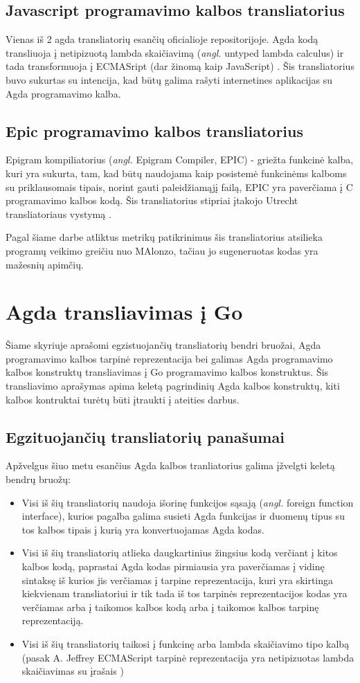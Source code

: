 \documentclass{VUMIFPSkursinis}
\begin{document}
\subsection{Javascript programavimo kalbos transliatorius}
Vienas iš 2 agda transliatorių esančių oficialioje repositorijoje. Agda kodą transliuoja į netipizuotą lambda skaičiavimą (\textit{angl.} untyped lambda calculus) ir tada transformuoja į ECMASript (dar žinomą kaip JavaScript) \cite{html_agda}. Šis transliatorius buvo sukurtas su intencija, kad būtų galima rašyti internetines aplikacijas su Agda programavimo kalba.
\subsection{Epic programavimo kalbos transliatorius}
Epigram kompiliatorius (\textit{angl.} Epigram Compiler, EPIC) - griežta funkcinė kalba, kuri yra sukurta, tam, kad būtų naudojama kaip posistemė funkcinėms kalboms su priklausomais tipais, norint gauti paleidžiamąjį failą, EPIC yra paverčiama į C programavimo kalbos kodą. Šis transliatorius stipriai įtakojo Utrecht transliatoriaus vystymą \cite{Utrecht}.\par Pagal šiame darbe atliktus metrikų patikrinimus šis transliatorius atsilieka programų veikimo greičiu nuo MAlonzo, tačiau jo sugeneruotas kodas yra mažesnių apimčių. 
\section{Agda transliavimas į Go}
Šiame skyriuje aprašomi egzistuojančių transliatorių bendri bruožai, Agda programavimo kalbos tarpinė reprezentacija bei galimas Agda programavimo kalbos konstruktų transliavimas į Go programavimo kalbos konstruktus. Šis transliavimo aprašymas apima keletą pagrindinių Agda kalbos konstruktų, kiti kalbos kontruktai turėtų būti įtraukti į ateities darbus.
\subsection{Egzituojančių transliatorių panašumai}
Apžvelgus šiuo metu esančius Agda kalbos tranliatorius galima įžvelgti keletą bendrų bruožų:
\begin{itemize}
	\item Visi iš šių transliatorių naudoja išorinę funkcijos sąsają (\textit{angl.} foreign function interface), kurios pagalba galima susieti Agda funkcijas ir duomenų tipus su tos kalbos tipais į kurią yra konvertuojamas Agda kodas.
	\item Visi iš šių transliatorių atlieka daugkartinius žingsius kodą verčiant į kitos kalbos kodą, paprastai Agda kodas pirmiausia yra paverčiamas į vidinę sintaksę iš kurios jis verčiamas į tarpine reprezentacija, kuri yra skirtinga kiekvienam transliatoriui ir tik tada iš tos tarpinės reprezentacijos kodas yra verčiamas arba į taikomos kalbos kodą arba į taikomos kalbos tarpinę reprezentaciją.
	\item Visi iš šių transliatorių taikosi į funkcinę arba lambda skaičiavimo tipo kalbą (pasak A. Jeffrey ECMAScript tarpinė reprezentacija yra netipizuotas lambda skaičiavimas su įrašais \cite{html_agda})
\end{itemize}
\end{document}
